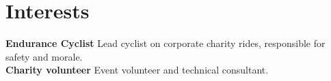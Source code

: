 \documentclass[11pt]{article}
\begin{document}
\section*{Interests}

\textbf{Endurance Cyclist} Lead cyclist on corporate charity rides, responsible for safety and morale.\\
\noindent \textbf{Charity volunteer} Event volunteer and technical consultant.

\end{document}
